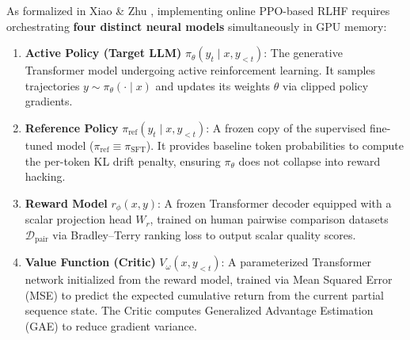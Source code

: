 \documentclass[../../main.tex]{subfiles}
\begin{document}
As formalized in Xiao \& Zhu \citep{xiao2025}, implementing online PPO-based RLHF requires orchestrating \textbf{four distinct neural models} simultaneously in GPU memory:
\begin{enumerate}
    \item \textbf{Active Policy (Target LLM)} $\pi_\theta(y_t \mid x, y_{<t})$: The generative Transformer model undergoing active reinforcement learning. It samples trajectories $y \sim \pi_\theta(\cdot \mid x)$ and updates its weights $\theta$ via clipped policy gradients.
    \item \textbf{Reference Policy} $\pi_{\text{ref}}(y_t \mid x, y_{<t})$: A frozen copy of the supervised fine-tuned model ($\pi_{\text{ref}} \equiv \pi_{\text{SFT}}$). It provides baseline token probabilities to compute the per-token KL drift penalty, ensuring $\pi_\theta$ does not collapse into reward hacking.
    \item \textbf{Reward Model} $r_\phi(x, y)$: A frozen Transformer decoder equipped with a scalar projection head $W_r$, trained on human pairwise comparison datasets $\mathcal{D}_{\text{pair}}$ via Bradley--Terry ranking loss to output scalar quality scores.
    \item \textbf{Value Function (Critic)} $V_\omega(x, y_{<t})$: A parameterized Transformer network initialized from the reward model, trained via Mean Squared Error (MSE) to predict the expected cumulative return from the current partial sequence state. The Critic computes Generalized Advantage Estimation (GAE) to reduce gradient variance.
\end{enumerate}
\end{document}
